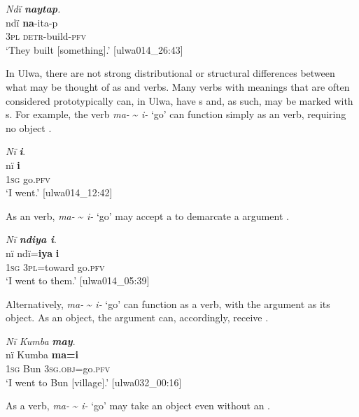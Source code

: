 \ea%
    \label{ex:syntax:297c}
          \textit{Ndï \textbf{naytap}.}\\
\gll    ndï \textbf{na}-ita-p\\
    3\textsc{pl} \textsc{detr}-build-\textsc{pfv}\\
\glt `They built [something].’ [ulwa014\_26:43]
\z

  In Ulwa, there are not strong distributional or structural differences between what may be thought of as  and  verbs. Many verbs with meanings that are often considered prototypically  can, in Ulwa, have s and, as such, may be marked with  s. For example, the verb \textit{ma-} {\textasciitilde} \textit{i-} ‘go’ can function simply as an  verb, requiring no object .

  \ea%
    \label{ex:syntax:298}
          \textit{Nï} \textbf{\textit{i}}.\\
\gll nï    \textbf{i}\\
    1\textsc{sg}  go.\textsc{pfv}\\
\glt `I went.’ [ulwa014\_12:42]
\z

  As an  verb, \textit{ma-} {\textasciitilde} \textit{i-} ‘go’ may accept a  to demarcate a  argument .

  \ea%
    \label{ex:syntax:299}
          \textit{Nï \textbf{ndiya i}}.\\
\gll nï    ndï=\textbf{iya}    \textbf{i}\\
    1\textsc{sg}  3\textsc{pl}=toward  go.\textsc{pfv}\\
\glt `I went to them.’ [ulwa014\_05:39]
\z

  Alternatively, \textit{ma-} {\textasciitilde} \textit{i-} ‘go’ can function as a  verb, with the  argument as its object. As an object, the  argument can, accordingly, receive  .


\ea%
    \label{ex:syntax:300}
          \textit{Nï Kumba} \textbf{\textit{may}}.\\
\gll nï    Kumba  \textbf{ma=i}\\
    1\textsc{sg} Bun  3\textsc{sg.obj}=go.\textsc{pfv}\\
\glt `I went to Bun [village].’ [ulwa032\_00:16]
\z
  
  As a  verb, \textit{ma-} {\textasciitilde} \textit{i-} ‘go’ may take an object even without an   .

